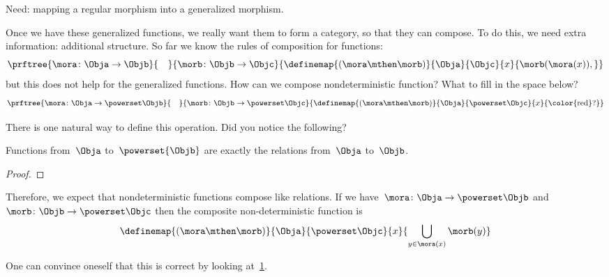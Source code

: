 Need: mapping a regular morphism into a generalized morphism.

Once we have these generalized functions, we really want them to form a category, so that they can compose. To do this, we need extra information: additional structure.
So far we know the rules of composition for functions:
% 
\begin{equation}\label{eq:monad-function-composition}
    \prftree{\mora\colon \Obja \to \Objb}{\quad}{\morb\colon \Objb \to \Objc}
    {\definemap{(\mora\mthen\morb)}{\Obja}{\Objc}%
    {x}{\morb(\mora(x)),}}
  \end{equation}
%   
but this does not help for the generalized functions. How can we compose nondeterministic function? What to fill in the space below?
% 
\begin{equation}\label{eq:monad-gen-function-composition}
    \prftree{\mora\colon \Obja \to \powerset\Objb}{\quad}{\morb\colon \Objb \to \powerset \Objc}
    {\definemap{(\mora\mthen\morb)}{\Obja}{\powerset\Objc}%
    {x}{\text{\color{red}?}}}
  \end{equation}

There is one natural way to define this operation. 
Did you notice the following?

\begin{lemma}\label{lem:powersets-relations}
Functions from~$\Obja$ to~$\powerset{\Objb}$ are exactly the relations from~$\Obja$ to~$\Objb$.
\end{lemma}

\begin{proof}
\end{proof}

Therefore, we expect that nondeterministic functions compose like relations.
If we have~$\mora\colon \Obja \to \powerset\Objb$ and~$\morb\colon \Objb \to \powerset \Objc$ then the composite non-deterministic function is
%
\begin{equation}\label{eq:fish-nondet}
    \definemap{(\mora\mthen\morb)}{\Obja}{\powerset\Objc}%
    {x}{ \displaystyle \bigcup_{y\in \mora(x)}\morb(y)}
\end{equation}

One can convince oneself that this is correct by looking at~\cref{fig:mapping-nondeterministic}.

\begin{figure}[h]
    \caption{}
    \label{fig:mapping-nondeterministic}
\end{figure}

